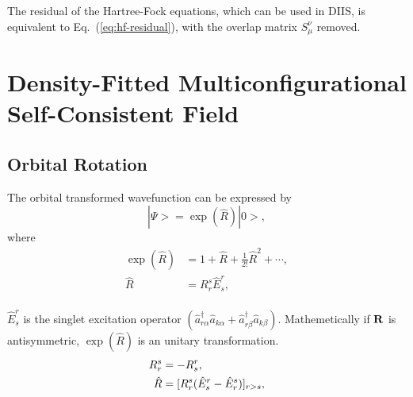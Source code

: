 \documentclass[a4paper,12pt,oneside]{book}
\newcommand{\eq}[1]{Eq.~(\ref{#1})}
\begin{document}
The residual of the Hartree-Fock equations, which can be used in DIIS, is equivalent to
\eq{eq:hf-residual}, with the overlap matrix $S_{\mu}^{\nu}$ removed.

\chapter{Density-Fitted Multiconfigurational Self-Consistent Field}
\section{Orbital Rotation}
The orbital transformed wavefunction can be expressed by
\begin{equation}
  |\Psi> = \exp(\hat{R})|0>,
\end{equation}
where
\begin{equation}
\begin{aligned}
  \exp(\hat{R}) &= 1+\hat{R}+\frac{1}{2!}\hat{R}^2+ \cdots, \\
  \hat{R} &= R_r^s\hat{E}_s^r,\\
\end{aligned}
\end{equation}

$\hat{E}^r_s$ is the singlet excitation operator $(\hat{a}_{r\alpha}^{\dagger}\hat{a}_{k\alpha}+\hat{a}_{r\beta}^{\dagger}\hat{a}_{k\beta} )$. 
Mathemetically if $\bf{R}$ is antisymmetric, $\exp(\hat{R})$ is an unitary transformation.
\begin{equation}
  \begin{aligned}
    R_r^s &= -R_s^r,\\
    \hat{R} &= [R_r^s(\hat{E}_s^r-\hat{E}_r^s)]_{r\mathchar"313E s},
  \end{aligned}
  \end{equation}
\end{document}
